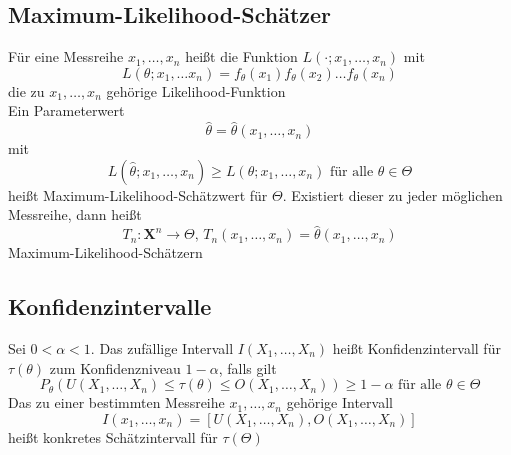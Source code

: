 \documentclass[
	ngerman,
	accentcolor=9c,%
	type=intern,
	marginpar=false
	]{tudapub}
\begin{document}
        \subsection{Maximum-Likelihood-Schätzer}
            \begin{definition}
                Für eine Messreihe $x_1, \dots, x_n$ heißt die Funktion $L(\cdot;x_1,\dots,x_n)$ mit 
                \begin{equation*}
                    L(\theta; x_1, \dots x_n) = f_\theta(x_1)f_\theta(x_2)\dots f_\theta(x_n)
                \end{equation*}
                die zu $x_1, \dots, x_n$ gehörige Likelihood-Funktion\\

                Ein Parameterwert
                \begin{equation*}
                    \hat{\theta} = \hat{\theta}(x_1, \dots, x_n) 
                \end{equation*}
                mit 
                \begin{equation*}
                    L(\hat{\theta}; x_1,\dots,x_n) \geq L(\theta; x_1,\dots,x_n) \text{ für alle }\theta \in \Theta
                \end{equation*}
                heißt Maximum-Likelihood-Schätzwert für $\Theta$. Existiert dieser zu jeder möglichen Messreihe, dann heißt
                \begin{equation*}
                    T_n:\mathbf{X}^n\rightarrow \Theta \mbox{, }T_n(x_1,\dots,x_n) = \hat{\theta}(x_1, \dots, x_n)
                \end{equation*}
                Maximum-Likelihood-Schätzern
            \end{definition}
        \subsection{Konfidenzintervalle}
            \begin{definition}
                Sei $0 < \alpha < 1$. Das zufällige Intervall $I(X_1, \dots, X_n)$ heißt Konfidenzintervall für $\tau(\theta)$ zum Konfidenzniveau $1-\alpha$, falls gilt 
                \begin{equation*}
                    P_\theta(U(X_1,\dots,X_n)\leq \tau(\theta) \leq O(X_1,\dots,X_n)) \geq 1-\alpha \text{ für alle } \theta \in \Theta
                \end{equation*}
                Das zu einer bestimmten Messreihe $x_1,\dots,x_n$ gehörige Intervall
                \begin{equation*}
                    I(x_1,\dots,x_n) = [U(X_1,\dots,X_n),O(X_1,\dots,X_n)]
                \end{equation*}
                heißt konkretes Schätzintervall für $\tau(\Theta)$
            \end{definition}
\end{document}

